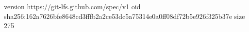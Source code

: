 version https://git-lfs.github.com/spec/v1
oid sha256:162a7626bfe8648cd3fffb2a2ce53dc5a75314e0a0ff08df72b5e926f325b37e
size 275
